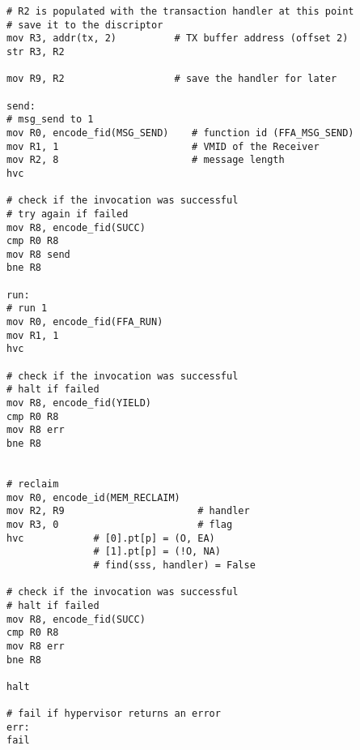 \documentclass{article}
\begin{document}
\begin{lstlisting}[caption={VM 0}]
# R2 is populated with the transaction handler at this point
# save it to the discriptor
mov R3, addr(tx, 2)          # TX buffer address (offset 2)
str R3, R2

mov R9, R2                   # save the handler for later

send:
# msg_send to 1
mov R0, encode_fid(MSG_SEND)    # function id (FFA_MSG_SEND)
mov R1, 1                       # VMID of the Receiver
mov R2, 8                       # message length
hvc

# check if the invocation was successful
# try again if failed
mov R8, encode_fid(SUCC)
cmp R0 R8
mov R8 send
bne R8

run:
# run 1
mov R0, encode_fid(FFA_RUN)
mov R1, 1
hvc

# check if the invocation was successful
# halt if failed
mov R8, encode_fid(YIELD)
cmp R0 R8
mov R8 err
bne R8


# reclaim
mov R0, encode_id(MEM_RECLAIM)
mov R2, R9                       # handler
mov R3, 0                        # flag
hvc            # [0].pt[p] = (O, EA)
               # [1].pt[p] = (!O, NA)
               # find(sss, handler) = False

# check if the invocation was successful
# halt if failed
mov R8, encode_fid(SUCC)
cmp R0 R8
mov R8 err
bne R8

halt

# fail if hypervisor returns an error
err:
fail

\end{lstlisting}
\end{document}
